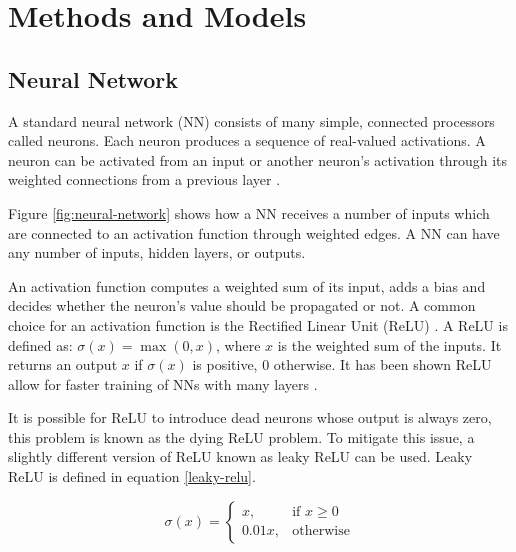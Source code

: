 \section{Methods and Models}

\subsection{Neural Network}

A standard neural network (NN) consists of many simple, connected processors called neurons. Each neuron produces a sequence of real-valued activations. A neuron can be activated from an input or another neuron's activation through its weighted connections from a previous layer \cite{NeuralNetwork}.

Figure \ref{fig:neural-network} shows how a NN receives a number of inputs which are connected to an activation function through weighted edges. A NN can have any number of inputs, hidden layers, or outputs.


An activation function computes a weighted sum of its input, adds a bias and decides whether the neuron's value should be propagated or not. A common choice for an activation function is the Rectified Linear Unit (ReLU) \cite{Relu}. A ReLU is defined as: $\sigma(x) = \max(0, x)$, where $x$ is the weighted sum of the inputs. It returns an output $x$ if $\sigma(x)$ is positive, $0$ otherwise. It has been shown ReLU allow for faster training of NNs with many layers \cite{cnn-star-galaxy}.


It is possible for ReLU to introduce dead neurons whose output is always zero, this problem is known as the dying ReLU problem. To mitigate this issue, a slightly different version of ReLU known as leaky ReLU can be used. Leaky ReLU is defined in equation \ref{leaky-relu}.

\begin{equation}
\sigma(x) =
\begin{cases} \label{leaky-relu}
    x      , & \text{if } x\geq 0\\
    0.01x , & \text{otherwise}
\end{cases}
\end{equation}

